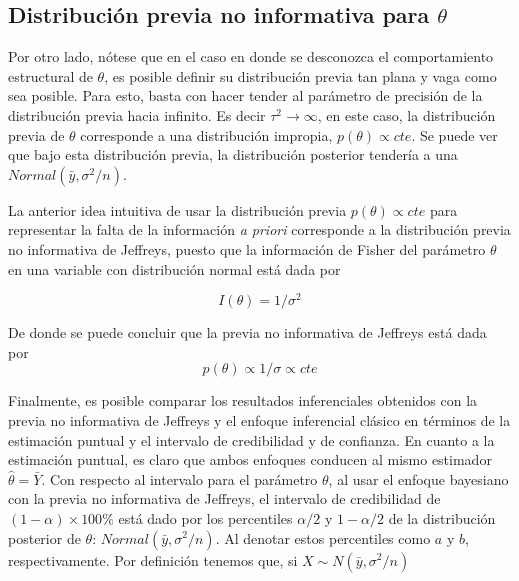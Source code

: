 \documentclass[
  10pt,
  spanish,
]{book}
\theoremstyle{definition}
\theoremstyle{definition}
\theoremstyle{definition}
\theoremstyle{definition}
\theoremstyle{remark}
\begin{document}
\hypertarget{distribuciuxf3n-previa-no-informativa-para-theta}{%
\subsection{\texorpdfstring{Distribución previa no informativa para \(\theta\)}{Distribución previa no informativa para \textbackslash theta}}\label{distribuciuxf3n-previa-no-informativa-para-theta}}

Por otro lado, nótese que en el caso en donde se desconozca el comportamiento estructural de \(\theta\), es posible definir su distribución previa tan plana y vaga como sea posible. Para esto, basta con hacer tender al parámetro de precisión de la distribución previa hacia infinito. Es decir \(\tau^2 \longrightarrow \infty\), en este caso, la distribución previa de \(\theta\) corresponde a una distribución impropia, \(p(\theta)\propto cte\). Se puede ver que bajo esta distribución previa, la distribución posterior tendería a una \(Normal(\bar{y},\sigma^2/n)\).

La anterior idea intuitiva de usar la distribución previa \(p(\theta)\propto cte\) para representar la falta de la información \emph{a priori} corresponde a la distribución previa no informativa de Jeffreys, puesto que la información de Fisher del parámetro \(\theta\) en una variable con distribución normal está dada por

\begin{equation*}
I(\theta)=1/\sigma^2
\end{equation*}

De donde se puede concluir que la previa no informativa de Jeffreys está dada por
\begin{equation*}
p(\theta)\propto 1/\sigma\propto cte
\end{equation*}

Finalmente, es posible comparar los resultados inferenciales obtenidos con la previa no informativa de Jeffreys y el enfoque inferencial clásico en términos de la estimación puntual y el intervalo de credibilidad y de confianza. En cuanto a la estimación puntual, es claro que ambos enfoques conducen al mismo estimador \(\hat{\theta}=\bar{Y}\). Con respecto al intervalo para el parámetro \(\theta\), al usar el enfoque bayesiano con la previa no informativa de Jeffreys, el intervalo de credibilidad de \((1-\alpha)\times 100\%\) está dado por los percentiles \(\alpha/2\) y \(1-\alpha/2\) de la distribución posterior de \(\theta\): \(Normal(\bar{y},\sigma^2/n)\). Al denotar estos percentiles como \(a\) y \(b\), respectivamente.
Por definición tenemos que, si \(X\sim N(\bar{y},\sigma^2/n)\)
\end{document}
